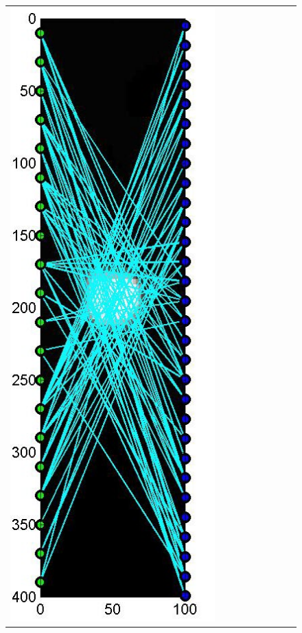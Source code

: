 \documentclass[11pt]{article}
\begin{document}
{\begin{figure}[!h]
\begin{center}
\begin{tabular}{|c|c|c|c|c|c|c|c|c|}
			\includegraphics[width=.9\iwidth]{figures/newFigs/noisy/resultsExp-4-designs}
			&

\end{tabular}
\end{center}
\end{figure}}
\end{document}
